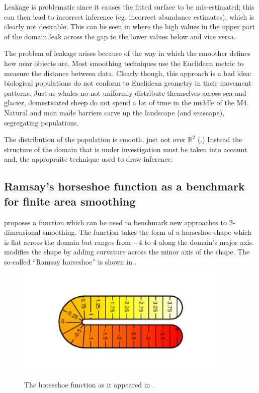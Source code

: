Leakage is problematic since it causes the fitted surface to be mis-estimated; this can then lead to incorrect inference (eg. incorrect abundance estimates), which is clearly not desirable. This can be seen in  where the high values in the upper part of the domain leak across the gap to the lower values below and vice versa.

The problem of leakage arises because of the way in which the smoother defines how near objects are. Most smoothing techniques use the Euclidean metric to measure the distance between data. Clearly though, this approach is a bad idea: biological populations do not conform to Euclidean geometry in their movement patterns. Just as whales no not uniformly distribute themselves across sea and glacier, domesticated sheep do not spend a lot of time in the middle of the M4. Natural and man made barriers carve up the landscape (and seascape), segregating populations.

The distribution of the population is smooth, just not over $\mathbb{R}^2$ (\cite{wangranalli}.) Instead the structure of the domain that is under investigation must be taken into account and, the appropraite technique used to draw inference.

\subsection{Ramsay's horseshoe function as a benchmark for finite area smoothing}

\cite{ramsay} proposes a function which can be used to benchmark new approaches to 2-dimensional smoothing. The function takes the form of a horseshoe shape which is flat across the domain but ranges from $-4$ to $4$ along the domain's major axis. \cite{soap} modifies the shape by adding curvature across the minor axis of the shape. The so-called ``Ramsay horseshoe'' is shown in .

\begin{figure}
\centering
\includegraphics[width=4in]{intro/figs/orig-fs.pdf}\\
\caption{The horseshoe function as it appeared in \cite{ramsay}.}
\label{leakage}
\end{figure}


